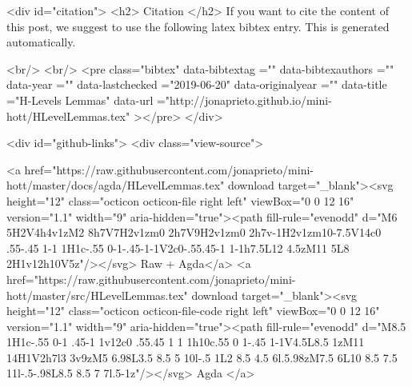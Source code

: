   
  <div id="citation">
  <h2> Citation </h2>
  If you want to cite the content of this post,
  we suggest to use the following latex bibtex entry.
  This is generated automatically.

  <br/>
  <br/>
  <pre class="bibtex"
       data-bibtextag =""
       data-bibtexauthors =""
       data-year =""
       data-lastchecked ="2019-06-20"
       data-originalyear =""
       data-title ="H-Levels Lemmas"
       data-url ="http://jonaprieto.github.io/mini-hott/HLevelLemmas.tex"
  ></pre>
  </div>
  

  <div id="github-links">
    <div class="view-source">
      
        <a href="https://raw.githubusercontent.com/jonaprieto/mini-hott/master/docs/agda/HLevelLemmas.tex" download target="_blank"><svg height="12" class="octicon octicon-file right left" viewBox="0 0 12 16" version="1.1" width="9" aria-hidden="true"><path fill-rule="evenodd" d="M6 5H2V4h4v1zM2 8h7V7H2v1zm0 2h7V9H2v1zm0 2h7v-1H2v1zm10-7.5V14c0 .55-.45 1-1 1H1c-.55 0-1-.45-1-1V2c0-.55.45-1 1-1h7.5L12 4.5zM11 5L8 2H1v12h10V5z"/></svg> Raw + Agda</a>
        <a href="https://raw.githubusercontent.com/jonaprieto/mini-hott/master/src/HLevelLemmas.tex" download target="_blank"><svg height="12" class="octicon octicon-file-code right left" viewBox="0 0 12 16" version="1.1" width="9" aria-hidden="true"><path fill-rule="evenodd" d="M8.5 1H1c-.55 0-1 .45-1 1v12c0 .55.45 1 1 1h10c.55 0 1-.45 1-1V4.5L8.5 1zM11 14H1V2h7l3 3v9zM5 6.98L3.5 8.5 5 10l-.5 1L2 8.5 4.5 6l.5.98zM7.5 6L10 8.5 7.5 11l-.5-.98L8.5 8.5 7 7l.5-1z"/></svg> Agda </a>
      
